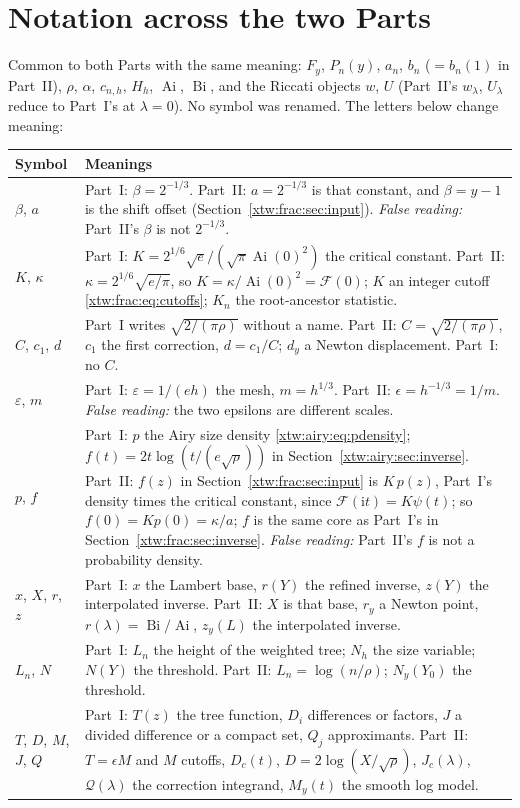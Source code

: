 \documentclass[11pt]{article}
\theoremstyle{remark}\newtheorem{remark}[theorem]{Remark}
\newcommand{\Ai}{\operatorname{Ai}}
\newcommand{\Bi}{\operatorname{Bi}}
\newcommand{\ii}{\mathrm i}
\newcommand{\FF}{\mathcal F}
\newcommand{\QQ}{\mathcal Q}
\begin{document}
\section*{Notation across the two Parts}\label{xtw:sec:notation}
Common to both Parts with the same meaning: $F_y$, $P_n(y)$, $a_n$, $b_n$
($=b_n(1)$ in Part~II), $\rho$, $\alpha$, $c_{n,h}$, $H_h$, $\Ai$, $\Bi$, and
the Riccati objects $w$, $U$ (Part~II's $w_\lambda$, $U_\lambda$ reduce to
Part~I's at $\lambda=0$). No symbol was renamed. The letters below change
meaning:
\begingroup\small
\renewcommand{\theHtable}{notation.\arabic{table}}
\begin{longtable}{@{}>{\raggedright\arraybackslash}p{} >{\raggedright\arraybackslash}p{}@{}}
\toprule
Symbol & Meanings\\
\midrule
\endhead
$\beta$, $a$ & Part~I: $\beta=2^{-1/3}$. Part~II: $a=2^{-1/3}$ is that constant, and $\beta=y-1$ is the shift offset (Section~\ref{xtw:frac:sec:input}). \emph{False reading:} Part~II's $\beta$ is not $2^{-1/3}$.\\
$K$, $\kappa$ & Part~I: $K=2^{1/6}\sqrt e/(\sqrt\pi\Ai(0)^2)$ the critical constant. Part~II: $\kappa=2^{1/6}\sqrt{e/\pi}$, so $K=\kappa/\Ai(0)^2=\FF(0)$; $K$ an integer cutoff \eqref{xtw:frac:eq:cutoffs}; $K_n$ the root-ancestor statistic.\\
$C$, $c_1$, $d$ & Part~I writes $\sqrt{2/(\pi\rho)}$ without a name. Part~II: $C=\sqrt{2/(\pi\rho)}$, $c_1$ the first correction, $d=c_1/C$; $d_y$ a Newton displacement. Part~I: no $C$.\\
$\varepsilon$, $m$ & Part~I: $\varepsilon=1/(eh)$ the mesh, $m=h^{1/3}$. Part~II: $\epsilon=h^{-1/3}=1/m$. \emph{False reading:} the two epsilons are different scales.\\
$p$, $f$ & Part~I: $p$ the Airy size density \eqref{xtw:airy:eq:pdensity}; $f(t)=2t\log(t/(e\sqrt\rho))$ in Section~\ref{xtw:airy:sec:inverse}. Part~II: $f(z)$ in Section~\ref{xtw:frac:sec:input} is $K\,p(z)$, Part~I's density times the critical constant, since $\FF(\ii t)=K\psi(t)$; so $f(0)=Kp(0)=\kappa/a$; $f$ is the same core as Part~I's in Section~\ref{xtw:frac:sec:inverse}. \emph{False reading:} Part~II's $f$ is not a probability density.\\
$x$, $X$, $r$, $z$ & Part~I: $x$ the Lambert base, $r(Y)$ the refined inverse, $z(Y)$ the interpolated inverse. Part~II: $X$ is that base, $r_y$ a Newton point, $r(\lambda)=\Bi/\Ai$, $z_y(L)$ the interpolated inverse.\\
$L_n$, $N$ & Part~I: $L_n$ the height of the weighted tree; $N_h$ the size variable; $N(Y)$ the threshold. Part~II: $L_n=\log(n/\rho)$; $N_y(Y_0)$ the threshold.\\
$T$, $D$, $M$, $J$, $Q$ & Part~I: $T(z)$ the tree function, $D_i$ differences or factors, $J$ a divided difference or a compact set, $Q_j$ approximants. Part~II: $T=\epsilon M$ and $M$ cutoffs, $D_c(t)$, $D=2\log(X/\sqrt\rho)$, $J_c(\lambda)$, $\QQ(\lambda)$ the correction integrand, $M_y(t)$ the smooth log model.\\
\bottomrule
\end{longtable}
\end{document}
